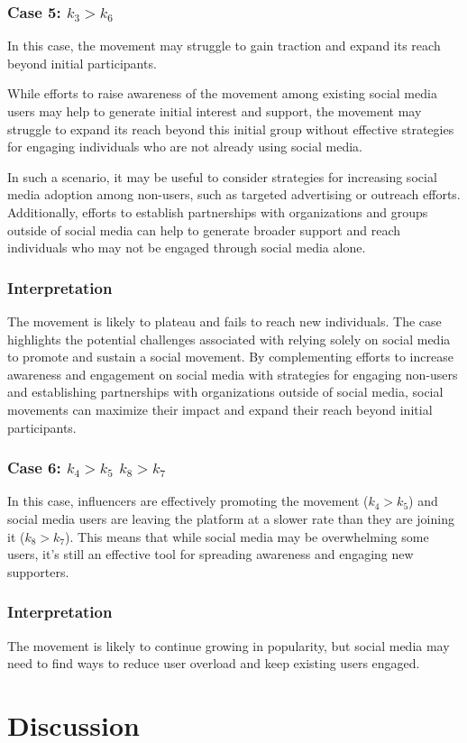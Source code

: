 \documentclass{article}
\begin{document}
    \subsubsection*{Case 5: $k_3 > k_6$}
    \begin{tcolorbox}
    In this case, the movement may struggle to gain traction and expand its reach beyond initial participants.
    
    While efforts to raise awareness of the movement among existing social media users may help to generate initial interest and support, the movement may struggle to expand its reach beyond this initial group without effective strategies for engaging individuals who are not already using social media.
    
    In such a scenario, it may be useful to consider strategies for increasing social media adoption among non-users, such as targeted advertising or outreach efforts. Additionally, efforts to establish partnerships with organizations and groups outside of social media can help to generate broader support and reach individuals who may not be engaged through social media alone.
    \subsubsection*{Interpretation}
    The movement is likely to plateau and fails to reach new individuals. The case highlights the potential challenges associated with relying solely on social media to promote and sustain a social movement. By complementing efforts to increase awareness and engagement on social media with strategies for engaging non-users and establishing partnerships with organizations outside of social media, social movements can maximize their impact and expand their reach beyond initial participants.
    \end{tcolorbox}

    \subsubsection*{Case 6: $k_4 > k_5$  $k_8 > k_7$}
    \begin{tcolorbox}
    In this case, influencers are effectively promoting the movement ($k_4 > k_5$) and social media users are leaving the platform at a slower rate than they are joining it ($k_8 > k_7$). This means that while social media may be overwhelming some users, it's still an effective tool for spreading awareness and engaging new supporters.
    \subsubsection*{Interpretation}
    The movement is likely to continue growing in popularity, but social media may need to find ways to reduce user overload and keep existing users engaged.
    \end{tcolorbox}


    \section{Discussion}
    \newpage
    
    
    
\end{document}
